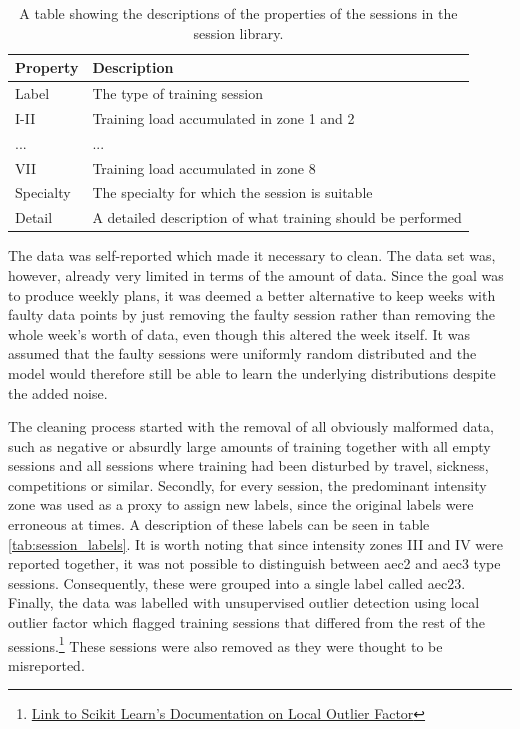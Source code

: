 \begin{table}
\centering
\begin{tabularx}{0.9\textwidth}{lL}
\toprule
Property  & Description                                                 \\ \midrule
Label     & The type of training session                                \\
I-II      & Training load accumulated in zone 1 and 2                   \\
...       & ...                                                         \\
VII       & Training load accumulated in zone 8                         \\
Specialty & The specialty for which the session is suitable             \\
Detail    & A detailed description of what training should be performed \\ \bottomrule
\end{tabularx}
\caption{A table showing the descriptions of the properties of the sessions in the session library.}
\label{tab:session_lib_description}
\end{table}

The data was self-reported which made it necessary to clean.
The data set was, however, already very limited in terms of the amount of data.
Since the goal was to produce weekly plans, it was deemed a better alternative to keep weeks with faulty data points by just removing the faulty session rather than removing the whole week's worth of data, even though this altered the week itself.
It was assumed that the faulty sessions were uniformly random distributed and the model would therefore still be able to learn the underlying distributions despite the added noise.

The cleaning process started with the removal of all obviously malformed data, such as negative or absurdly large amounts of training together with all empty sessions and all sessions where training had been disturbed by travel, sickness, competitions or similar.
Secondly, for every session, the predominant intensity zone was used as a proxy to assign new labels, since the original labels were erroneous at times.
A description of these labels can be seen in table \cref{tab:session_labels}.
It is worth noting that since intensity zones III and IV were reported together, it was not possible to distinguish between aec2 and aec3 type sessions.
Consequently, these were grouped into a single label called aec23.
Finally, the data was labelled with unsupervised outlier detection using local outlier factor which flagged training sessions that differed from the rest of the sessions.\footnote{\href{https://scikit-learn.org/stable/modules/generated/sklearn.neighbors.LocalOutlierFactor.html}{Link to Scikit Learn's Documentation on Local Outlier Factor}}
These sessions were also removed as they were thought to be misreported.


